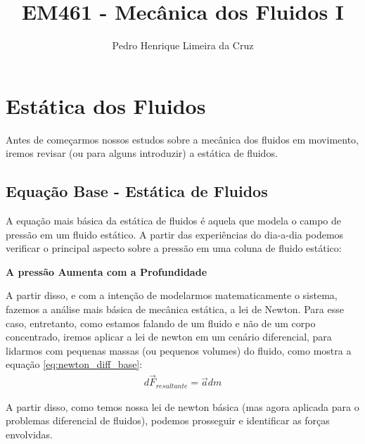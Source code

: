 \documentclass{article}
\author{Pedro Henrique Limeira da Cruz}
\title{EM461 - Mecânica dos Fluidos I}
\begin{document}
\maketitle
\thispagestyle{empty}


\newpage
\tableofcontents
\newpage

\section{Estática dos Fluidos}
Antes de começarmos nossos estudos sobre a mecânica dos fluidos em movimento, iremos revisar (ou para alguns introduzir) a estática de fluidos.

\subsection{Equação Base - Estática de Fluidos}
A equação mais básica da estática de fluidos é aquela que modela o campo de pressão em um fluido estático. A partir das experiências do dia-a-dia podemos verificar o principal aspecto
sobre a pressão em uma coluna de fluido estático:

\begin{center}
    \textbf{A pressão Aumenta com a Profundidade}
\end{center}

A partir disso, e com a intenção de modelarmos matematicamente o sistema, fazemos a análise mais básica de mecânica estática, a lei de Newton. Para esse caso, entretanto, como estamos
falando de um fluido e não de um corpo concentrado, iremos aplicar a lei de newton em um cenário diferencial, para lidarmos com pequenas massas (ou pequenos volumes) do fluido, como mostra a equação \ref{eq:newton_diff_base}:
\begin{align}
    d\vec{F}_{resultante}= \vec a dm \label{eq:newton_diff_base}
\end{align}

A partir disso, como temos nossa lei de newton básica (mas agora aplicada para o problemas diferencial de fluidos), podemos prosseguir e identificar as forças envolvidas.
\end{document}
